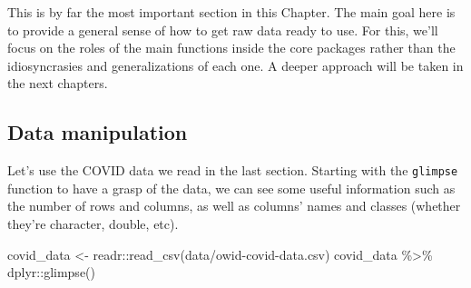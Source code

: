 \documentclass[
]{book}
\newenvironment{Shaded}{\begin{snugshade}}{\end{snugshade}}
\newcommand{\FunctionTok}[1]{\textcolor[rgb]{0.00,0.00,0.00}{#1}}
\newcommand{\NormalTok}[1]{#1}
\newcommand{\OtherTok}[1]{\textcolor[rgb]{0.56,0.35,0.01}{#1}}
\newcommand{\SpecialCharTok}[1]{\textcolor[rgb]{0.00,0.00,0.00}{#1}}
\newcommand{\StringTok}[1]{\textcolor[rgb]{0.31,0.60,0.02}{#1}}
\begin{document}
This is by far the most important section in this Chapter. The main goal here is to provide a general sense of how to get raw data ready to use. For this, we'll focus on the roles of the main functions inside the core packages rather than the idiosyncrasies and generalizations of each one. A deeper approach will be taken in the next chapters.

\hypertarget{data-manipulation}{%
\subsection{Data manipulation}\label{data-manipulation}}

Let's use the COVID data we read in the last section. Starting with the \texttt{glimpse} function to have a grasp of the data, we can see some useful information such as the number of rows and columns, as well as columns' names and classes (whether they're character, double, etc).

\begin{Shaded}
\begin{Highlighting}[]
\NormalTok{covid\_data }\OtherTok{\textless{}{-}}\NormalTok{ readr}\SpecialCharTok{::}\FunctionTok{read\_csv}\NormalTok{(}\StringTok{\textquotesingle{}data/owid{-}covid{-}data.csv\textquotesingle{}}\NormalTok{)}
\NormalTok{covid\_data }\SpecialCharTok{\%\textgreater{}\%} 
\NormalTok{  dplyr}\SpecialCharTok{::}\FunctionTok{glimpse}\NormalTok{()}
\end{Highlighting}
\end{Shaded}
\end{document}
